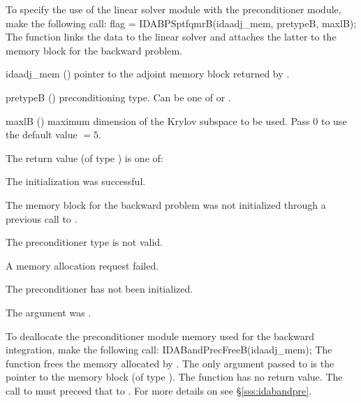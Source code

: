 {}
To specify the use of the {\idasptfqmr} linear solver module with the {\idabandpre} 
preconditioner module, make the following call:
{
  flag = IDABPSptfqmrB(idaadj\_mem, pretypeB, maxlB);
}
{
  The function  links the {\idabandpre} data to the
  {\idasptfqmr} linear solver and attaches the latter to the {\idas}
  memory block for the backward problem.
}
{
  \begin{args}
  \item[idaadj\_mem] ()
    pointer to the adjoint memory block returned by .
  \item[pretypeB] ()
    preconditioning type. Can be one of  or .
  \item[maxlB] ()
    maximum dimension of the Krylov subspace to be used. Pass $0$ to use the 
    default value $=5$.
  \end{args}
}
{
  The return value  (of type ) is one of:
  \begin{args}
  \item[\Id{IDABANDPRE\_ADJMEM\_NULL}]
    The {\idasptfqmr} initialization was successful.
  \item[\Id{IDASPILS\_MEM\_NULL}]
    The {\idas} memory block for the backward problem was not initialized through a 
    previous call to .
  \item[\Id{IDASPILS\_ILL\_INPUT}]
    The preconditioner type  is not valid.
  \item[\Id{IDASPILS\_MEM\_FAIL}]
    A memory allocation request failed.
  \item[\Id{IDABANDPRE\_PDATA\_NULL}]
    The {\idabandpre} preconditioner has not been initialized.
  \item[\Id{IDABANDPRE\_ADJMEM\_NULL}]
    The  argument was .
  \end{args}
}
{}
To deallocate the {\idabandpre} preconditioner module memory used for the
backward integration, make the following call:
{
  IDABandPrecFreeB(idaadj\_mem);
}
{
  The function  frees the memory allocated by
  .
}
{
  The only argument passed to  is the pointer to the {\idaa} 
  memory block (of type ).
}
{
  The function  has no return value.
}
{
  The call to  must preceed that to .
}
For more details on {\idabandpre} see \S\ref{sss:idabandpre}.

